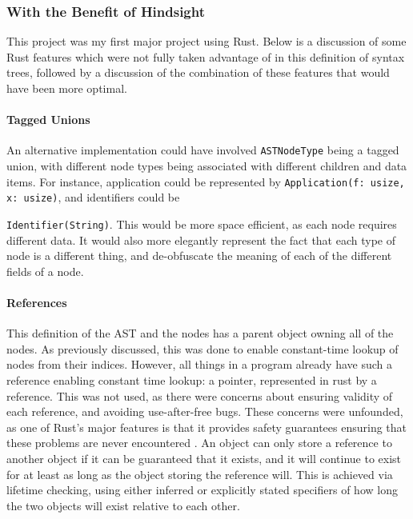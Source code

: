 \subsubsection{With the Benefit of Hindsight} %
This project was my first major project using Rust. Below is a discussion of some Rust features which were not fully taken advantage of in this definition of syntax trees, followed by a discussion of the combination of these features that would have been more optimal. 

\paragraph{Tagged Unions}
An alternative implementation could have involved \verb|ASTNodeType| being a tagged union, with different node types being associated with different children and data items. For instance, application could be represented by \verb|Application(f: usize, x: usize)|, and identifiers could be 

\noindent\verb|Identifier(String)|. This would be more space efficient, as each node requires different data. It would also more elegantly represent the fact that each type of node is a different thing, and de-obfuscate the meaning of each of the different fields of a node. 

\paragraph{References}
This definition of the AST and the nodes has a parent object owning all of the nodes. As previously discussed, this was done to enable constant-time lookup of nodes from their indices. However, all things in a program already have such a reference enabling constant time lookup: a pointer, represented in rust by a reference. This was not used, as there were concerns about ensuring validity of each reference, and avoiding use-after-free bugs. These concerns were unfounded, as one of Rust's major features is that it provides safety guarantees ensuring that these problems are never encountered \cite{rust_book}. An object can only store a reference to another object if it can be guaranteed that it exists, and it will continue to exist for at least as long as the object storing the reference will. This is achieved via lifetime checking, using either inferred or explicitly stated specifiers of how long the two objects will exist relative to each other. 

